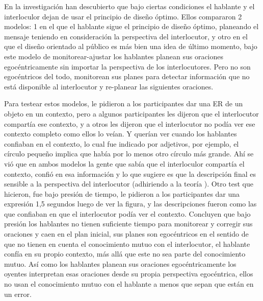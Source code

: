 En la investigaci\'on \cite{keysar:Curr98} han descubierto que bajo ciertas condiciones el hablante y el interloculor dejan de usar el principio de dise\~no \'optimo. %
Ellos compararon 2 modelos: 1 en el que el hablante sigue el principio de dise\~no \'optimo, planeando el mensaje teniendo en consideraci\'on la perspectiva del interlocutor, y otro en el que el dise\~no orientado al p\'ublico es m\'as bien una idea de \'ultimo momento, bajo este modelo de monitorear-ajustar los hablantes planean sus oraciones egoc\'entricamente sin importar la perspectiva de los interlocutores. Pero no son egoc\'entricos del todo, monitorean sus planes para detectar informaci\'on que no est\'a disponible al interlocutor y re-planear las siguientes oraciones.

Para testear estos modelos, le pidieron a los participantes dar una ER de un objeto en un contexto, pero a algunos participantes les dijeron que el interlocutor compart\'ia ese contexto, y a otros les dijeron que el interlocutor no pod\'ia ver ese contexto completo como ellos lo ve\'ian. Y quer\'ian ver cuando los hablantes confiaban en el contexto, lo cual fue indicado por adjetivos, por ejemplo, el c\'irculo peque\~no implica que hab\'ia por lo menos otro c\'irculo m\'as grande. Ah\'i se vi\'o que en ambos modelos la gente que sab\'ia que el interloculor compart\'ia el contexto, confi\'o en esa informaci\'on y lo que sugiere es que la descripci\'on final es sensible a la perspectiva del interlocutor (adhiriendo a la teor\'ia \cite{Clark-Marshall81}). Otro test que hicieron, fue bajo presi\'on de tiempo, le pidieron a los participantes dar una expresi\'on 1,5 segundos luego de ver la figura, y las descripciones fueron como las que confiaban en que el interlocutor pod\'ia ver el contexto. Concluyen que bajo presi\'on los hablantes no tienen suficiente tiempo para monitorear y corregir sus oraciones y caen en el plan inicial, sus planes son egoc\'entricos en el sentido de que no tienen en cuenta el conocimiento mutuo con el interlocutor, el hablante conf\'ia en su propio contexto, m\'as all\'a que este no sea parte del conocimiento mutuo. As\'i como los hablantes planean sus oraciones egoc\'entricamente los oyentes interpretan esas oraciones desde su propia perspectiva egoc\'entrica, ellos no usan el conocimiento mutuo con el hablante a menos que sepan que est\'an en un error.


